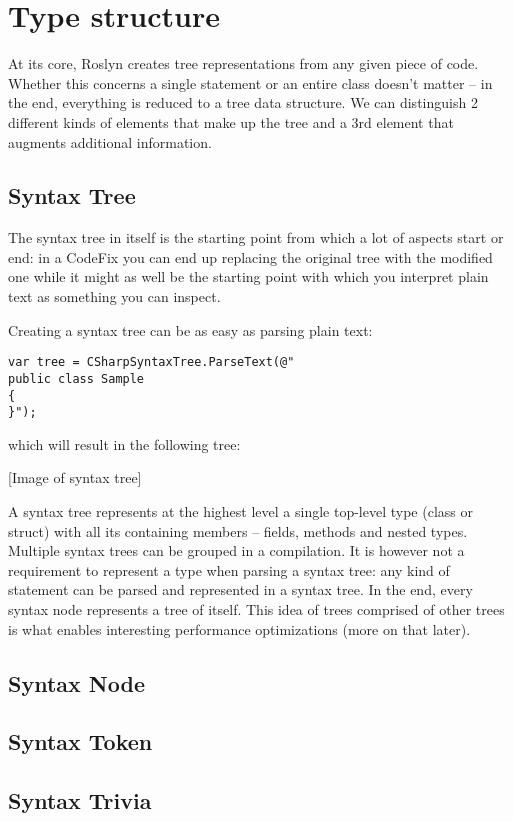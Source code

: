 \section{Type structure}
\label{sec:type-structure}

At its core, Roslyn creates tree representations from any given piece of code. Whether this concerns a single statement or an entire class doesn't matter -- in the end, everything is reduced to a tree data structure. We can distinguish 2 different kinds of elements that make up the tree and a 3rd element that augments additional information.

\subsection{Syntax Tree}
\label{sec:syntax-tree}

The syntax tree in itself is the starting point from which a lot of aspects start or end: in a CodeFix you can end up replacing the original tree with the modified one while it might as well be the starting point with which you interpret plain text as something you can inspect.

Creating a syntax tree can be as easy as parsing plain text:

\begin{lstlisting}
var tree = CSharpSyntaxTree.ParseText(@"
public class Sample
{
}");
\end{lstlisting}

which will result in the following tree:

[Image of syntax tree]

A syntax tree represents at the highest level a single top-level type (class or struct) with all its containing members -- fields, methods and nested types. Multiple syntax trees can be grouped in a compilation. It is however not a requirement to represent a type when parsing a syntax tree: any kind of statement can be parsed and represented in a syntax tree. In the end, every syntax node represents a tree of itself. This idea of trees comprised of other trees is what enables interesting performance optimizations (more on that later). 

\subsection{Syntax Node}
\label{sec:syntax-node}

\subsection{Syntax Token}
\label{sec:syntax-token}

\subsection{Syntax Trivia}
\label{sec:syntax-trivia}
